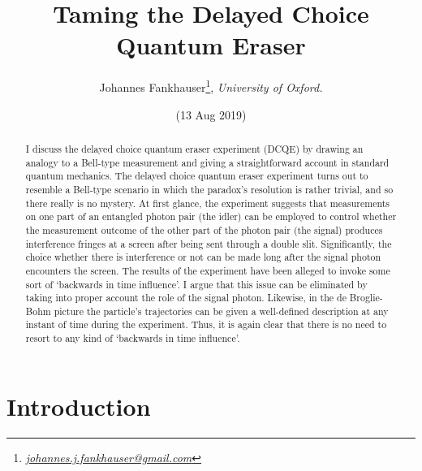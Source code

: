 \documentclass[12pt]{article}
\title{\textbf{Taming the Delayed Choice Quantum Eraser}}
\author[1]{Johannes Fankhauser\thanks{\href{mailto:johannes.j.fankhauser@gmail.com}{\it johannes.j.fankhauser@gmail.com}}, \it University of Oxford.}
\date{(13 Aug 2019)}                                             %
\numberwithin{equation}{section}
\begin{document}
\maketitle

\begin{abstract} 

I discuss the delayed choice quantum eraser experiment (DCQE) by drawing an analogy to a Bell-type measurement and giving a straightforward account in standard quantum mechanics. The delayed choice quantum eraser experiment turns out to resemble a Bell-type scenario in which the paradox's resolution is rather trivial, and so there really is no mystery.  At first glance, the experiment suggests that measurements on one part of an entangled photon pair (the idler) can be employed to control whether the measurement outcome of the other part of the photon pair (the signal) produces interference fringes at a screen after being sent through a double slit. Significantly, the choice whether there is interference or not can be made long after the signal photon encounters the screen. The results of the experiment have been alleged to invoke some sort of `backwards in time influence'. I argue that this issue can be eliminated by taking into proper account the role of the signal photon. Likewise, in the de Broglie-Bohm picture the particle's trajectories can be given a well-defined description at any instant of time during the experiment. Thus, it is again clear that there is no need to resort to any kind of `backwards in time influence'.  

 
\end{abstract}



\newpage

\section{Introduction}
\end{document}
